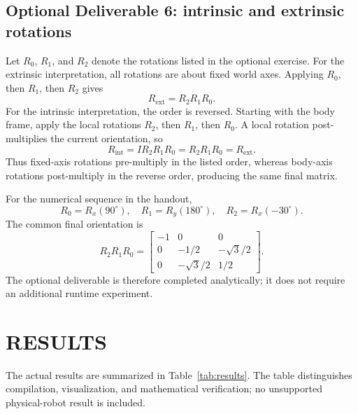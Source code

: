 \documentclass[letterpaper, 10 pt, conference]{ieeeconf}
\begin{document}
\subsection{Optional Deliverable 6: intrinsic and extrinsic rotations}
Let \(R_0\), \(R_1\), and \(R_2\) denote the rotations listed in the optional exercise. For the extrinsic interpretation, all rotations are about fixed world axes. Applying \(R_0\), then \(R_1\), then \(R_2\) gives
\begin{equation}
R_{\mathrm{ext}}=R_2R_1R_0.
\label{eq:extrinsic}
\end{equation}
For the intrinsic interpretation, the order is reversed. Starting with the body frame, apply the local rotations \(R_2\), then \(R_1\), then \(R_0\). A local rotation post-multiplies the current orientation, so
\begin{equation}
R_{\mathrm{int}}=I R_2 R_1 R_0=R_2R_1R_0=R_{\mathrm{ext}}.
\label{eq:intrinsic}
\end{equation}
Thus fixed-axis rotations pre-multiply in the listed order, whereas body-axis rotations post-multiply in the reverse order, producing the same final matrix.

For the numerical sequence in the handout,
\begin{equation}
R_0=R_x(90^\circ),\quad R_1=R_y(180^\circ),\quad R_2=R_x(-30^\circ).
\end{equation}
The common final orientation is
\begin{equation}
R_2R_1R_0=
\begin{bmatrix}
-1&0&0\\
0&-1/2&-\sqrt{3}/2\\
0&-\sqrt{3}/2&1/2
\end{bmatrix}.
\label{eq:rotation_equivalence_result}
\end{equation}
The optional deliverable is therefore completed analytically; it does not require an additional runtime experiment.

\section{RESULTS}
\label{sec:results}
The actual results are summarized in Table~\ref{tab:results}. The table distinguishes compilation, visualization, and mathematical verification; no unsupported physical-robot result is included.
\end{document}
